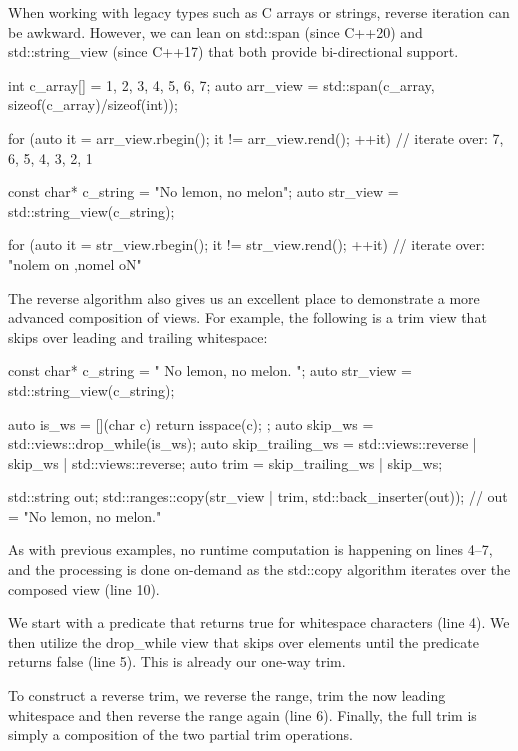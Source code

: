 When working with legacy types such as C arrays or strings, reverse iteration can be awkward. However, we can lean on std::span (since C++20) and std::string\_view (since C++17) that both provide bi-directional support.

\begin{box-note}
\begin{cppcode}
int c_array[] = {1, 2, 3, 4, 5, 6, 7};
auto arr_view = std::span(c_array, sizeof(c_array)/sizeof(int));

for (auto it = arr_view.rbegin(); it != arr_view.rend(); ++it) {
    // iterate over: {7, 6, 5, 4, 3, 2, 1}
}

const char* c_string = "No lemon, no melon";
auto str_view = std::string_view(c_string);

for (auto it = str_view.rbegin(); it != str_view.rend(); ++it) {
    // iterate over: "nolem on ,nomel oN"
}
\end{cppcode}
\end{box-note}

The reverse algorithm also gives us an excellent place to demonstrate a more advanced composition of views. For example, the following is a trim view that skips over leading and trailing whitespace:

\begin{box-note}
\begin{cppcode}
const char* c_string = "  No lemon, no melon.     ";
auto str_view = std::string_view(c_string);

auto is_ws = [](char c) { return isspace(c); };
auto skip_ws = std::views::drop_while(is_ws);
auto skip_trailing_ws = std::views::reverse | skip_ws | std::views::reverse;
auto trim = skip_trailing_ws | skip_ws;

std::string out;
std::ranges::copy(str_view | trim, std::back_inserter(out));
// out = "No lemon, no melon."
\end{cppcode}
\end{box-note}

As with previous examples, no runtime computation is happening on lines 4–7, and the processing is done on-demand as the std::copy algorithm iterates over the composed view (line 10).

We start with a predicate that returns true for whitespace characters (line 4). We then utilize the drop\_while view that skips over elements until the predicate returns false (line 5). This is already our one-way trim.

To construct a reverse trim, we reverse the range, trim the now leading whitespace and then reverse the range again (line 6). Finally, the full trim is simply a composition of the two partial trim operations.

